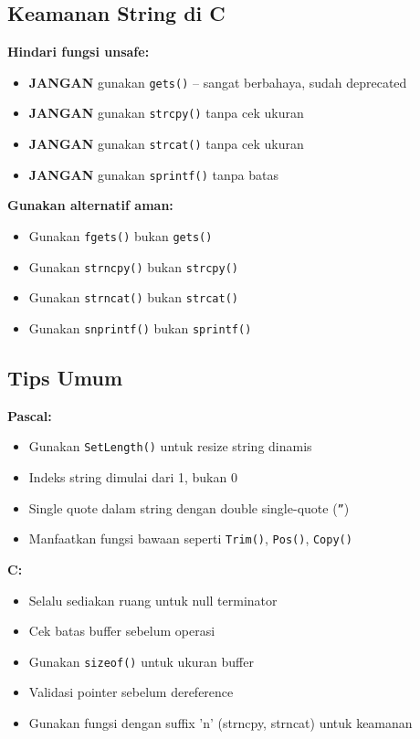\documentclass[../main.tex]{subfiles}
\begin{document}
\subsection{Keamanan String di C}

\textbf{Hindari fungsi unsafe:}
\begin{itemize}
  \item \textbf{JANGAN} gunakan \texttt{gets()} -- sangat berbahaya, sudah deprecated
  \item \textbf{JANGAN} gunakan \texttt{strcpy()} tanpa cek ukuran
  \item \textbf{JANGAN} gunakan \texttt{strcat()} tanpa cek ukuran
  \item \textbf{JANGAN} gunakan \texttt{sprintf()} tanpa batas
\end{itemize}

\textbf{Gunakan alternatif aman:}
\begin{itemize}
  \item Gunakan \texttt{fgets()} bukan \texttt{gets()}
  \item Gunakan \texttt{strncpy()} bukan \texttt{strcpy()}
  \item Gunakan \texttt{strncat()} bukan \texttt{strcat()}
  \item Gunakan \texttt{snprintf()} bukan \texttt{sprintf()}
\end{itemize}

\subsection{Tips Umum}

\textbf{Pascal:}
\begin{itemize}
  \item Gunakan \texttt{SetLength()} untuk resize string dinamis
  \item Indeks string dimulai dari 1, bukan 0
  \item Single quote dalam string dengan double single-quote (\texttt{''})
  \item Manfaatkan fungsi bawaan seperti \texttt{Trim()}, \texttt{Pos()}, \texttt{Copy()}
\end{itemize}

\textbf{C:}
\begin{itemize}
  \item Selalu sediakan ruang untuk null terminator
  \item Cek batas buffer sebelum operasi
  \item Gunakan \texttt{sizeof()} untuk ukuran buffer
  \item Validasi pointer sebelum dereference
  \item Gunakan fungsi dengan suffix 'n' (strncpy, strncat) untuk keamanan
\end{itemize}
\end{document}
